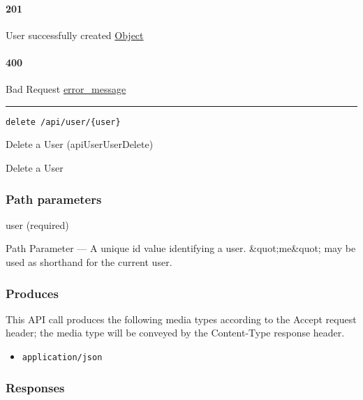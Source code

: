 \hypertarget{section-575}{%
\paragraph{201}\label{section-575}}

User successfully created \protect\hyperlink{Object}{Object}

\hypertarget{section-576}{%
\paragraph{400}\label{section-576}}

Bad Request \protect\hyperlink{error_message}{error\_message}

\begin{center}\rule{0.5\linewidth}{\linethickness}\end{center}

\protect\hypertarget{apiUserUserDelete}{}{}

\begin{verbatim}
delete /api/user/{user}
\end{verbatim}

Delete a User ({apiUserUserDelete})

Delete a User

\hypertarget{path-parameters-97}{%
\subsubsection{Path parameters}\label{path-parameters-97}}

user (required)

{Path Parameter} --- A unique id value identifying a user.
\&quot;me\&quot; may be used as shorthand for the current user.

\hypertarget{produces-174}{%
\subsubsection{Produces}\label{produces-174}}

This API call produces the following media types according to the
{Accept} request header; the media type will be conveyed by the
{Content-Type} response header.

\begin{itemize}
\tightlist
\item
  \texttt{application/json}
\end{itemize}

\hypertarget{responses-180}{%
\subsubsection{Responses}\label{responses-180}}

